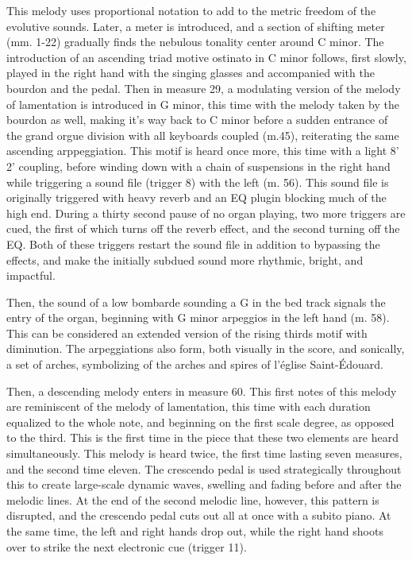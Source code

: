\documentclass[12pt,twoside,maitrise]{dms_ks}
\theoremstyle{definition}
\begin{document}
This melody uses proportional notation to add to the metric freedom of the evolutive sounds. Later, a meter is introduced, and a section of shifting meter (mm. 1-22) gradually finds the nebulous tonality center around C minor.
The introduction of an ascending triad motive ostinato in C minor follows, first slowly, played in the right hand with the singing glasses and accompanied with the bourdon and the pedal. Then in measure 29, a modulating version of the melody of lamentation is introduced in G minor, this time with the melody taken by the bourdon as well, making it's way back to C minor before a sudden entrance of the grand orgue division with all keyboards coupled (m.45), reiterating the same ascending arppeggiation. This motif is heard once more, this time with a light 8' 2' coupling, before winding down with a chain of suspensions in the right hand while triggering a sound file (trigger 8) with the left (m. 56). This sound file is originally triggered with heavy reverb and an EQ plugin blocking much of the high end. During a thirty second pause of no organ playing, two more triggers are cued, the first of which turns off the reverb effect, and the second turning off the EQ. Both of these triggers restart the sound file in addition to bypassing the effects, and make the initially subdued sound more rhythmic, bright, and impactful. 



Then, the sound of a low bombarde sounding a G in the bed track signals the entry of the organ, beginning with G minor arpeggios in the left hand (m. 58). This can be considered an extended version of the rising thirds motif with diminution. 
The arpeggiations also form, both visually in the score, and sonically, a set of arches, symbolizing of the arches and spires of l'église Saint-Édouard.


Then, a descending melody enters in measure 60. This first notes of this melody are reminiscent of the melody of lamentation, this time with each duration equalized to the whole note, and beginning on the first scale degree, as opposed to the third. This is the first time in the piece that these two elements are heard simultaneously. This melody is heard twice, the first time lasting seven measures, and the second time eleven. The crescendo pedal is used strategically throughout this to create large-scale dynamic waves, swelling and fading before and after the melodic lines. At the end of the second melodic line, however, this pattern is disrupted, and the crescendo pedal cuts out all at once with a subito piano. At the same time, the left and right hands drop out, while the right hand shoots over to strike the next electronic cue (trigger 11). 
\end{document}
